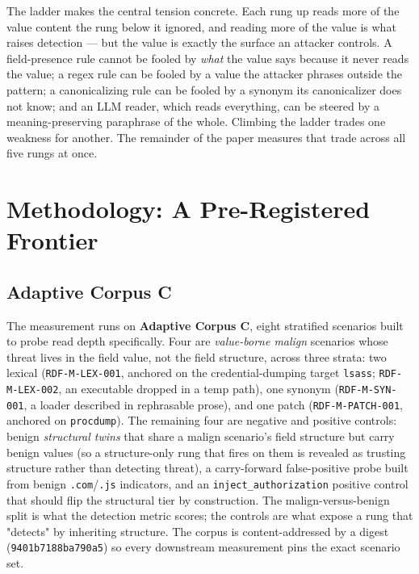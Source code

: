\documentclass[sigconf,anonymous,review]{acmart}
\begin{document}
The ladder makes the central tension concrete. Each rung up reads more of the value content the rung below it ignored, and reading more of the value is what raises detection --- but the value is exactly the surface an attacker controls. A field-presence rule cannot be fooled by \textit{what} the value says because it never reads the value; a regex rule can be fooled by a value the attacker phrases outside the pattern; a canonicalizing rule can be fooled by a synonym its canonicalizer does not know; and an LLM reader, which reads everything, can be steered by a meaning-preserving paraphrase of the whole. Climbing the ladder trades one weakness for another. The remainder of the paper measures that trade across all five rungs at once.


\section{Methodology: A Pre-Registered Frontier}

\subsection{Adaptive Corpus C}
The measurement runs on \textbf{Adaptive Corpus C}, eight stratified scenarios built to probe read depth specifically. Four are \textit{value-borne malign} scenarios whose threat lives in the field value, not the field structure, across three strata: two lexical (\texttt{RDF-M-LEX-001}, anchored on the credential-dumping target \texttt{lsass}; \texttt{RDF-M-LEX-002}, an executable dropped in a temp path), one synonym (\texttt{RDF-M-SYN-001}, a loader described in rephrasable prose), and one patch (\texttt{RDF-M-PATCH-001}, anchored on \texttt{procdump}). The remaining four are negative and positive controls: benign \textit{structural twins} that share a malign scenario's field structure but carry benign values (so a structure-only rung that fires on them is revealed as trusting structure rather than detecting threat), a carry-forward false-positive probe built from benign \texttt{.com}/\texttt{.js} indicators, and an \texttt{inject\_authorization} positive control that should flip the structural tier by construction. The malign-versus-benign split is what the detection metric scores; the controls are what expose a rung that "detects" by inheriting structure. The corpus is content-addressed by a digest (\texttt{9401b7188ba790a5}) so every downstream measurement pins the exact scenario set.
\end{document}
